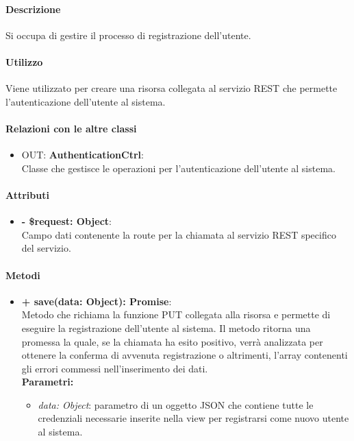 		\paragraph{Descrizione}
		Si occupa di gestire il processo di registrazione dell'utente.
		
		\paragraph{Utilizzo}
		Viene utilizzato per creare una risorsa collegata al servizio \gls{REST} che permette l'autenticazione dell'utente al sistema.
		
		\paragraph{Relazioni con le altre classi}
		\begin{itemize}
			\item OUT: \textbf{AuthenticationCtrl}:\\
			Classe che gestisce le operazioni per l'autenticazione dell'utente al sistema.
		\end{itemize}
		
		\paragraph{Attributi}
		\begin{itemize}
			\item \textbf{- \$request: Object}:\\
			Campo dati contenente la route per la chiamata al servizio \gls{REST} specifico del servizio.
		\end{itemize}	
		
		\paragraph{Metodi}
		\begin{itemize}
			\item \textbf{+ save(data: Object): Promise}:\\
			Metodo che richiama la funzione PUT collegata alla risorsa e permette di eseguire la registrazione dell'utente al sistema. Il metodo ritorna una promessa la quale, se la chiamata ha esito positivo, verrà analizzata per ottenere la conferma di avvenuta registrazione o altrimenti, l'array contenenti gli errori commessi nell'inserimento dei dati.\\
			\textbf{Parametri:}\\
			\begin{itemize}
				\item \textit{data: Object}: parametro di un oggetto \gls{JSON} che contiene tutte le credenziali necessarie inserite nella view per registrarsi come nuovo utente al sistema.
			\end{itemize}
		\end{itemize}
\newpage
		

